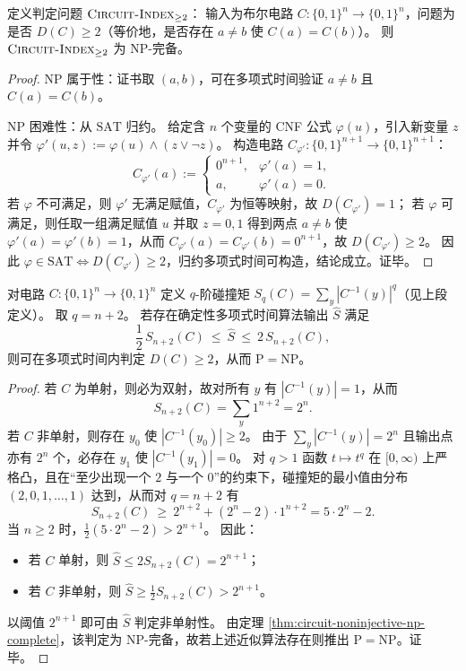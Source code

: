 \begin{theorem}\label{thm:circuit-noninjective-np-complete}
定义判定问题 \(\textsc{Circuit-Index}_{\ge 2}\)：
输入为布尔电路 \(C:\{0,1\}^n\to\{0,1\}^n\)，问题为是否 \(D(C)\ge 2\)（等价地，是否存在 \(a\neq b\) 使 \(C(a)=C(b)\)）。
则 \(\textsc{Circuit-Index}_{\ge 2}\) 为 \(\mathrm{NP}\)-完备。
\end{theorem}

\begin{proof}
\(\mathrm{NP}\) 属于性：证书取 \((a,b)\)，可在多项式时间验证 \(a\neq b\) 且 \(C(a)=C(b)\)。
\par
\(\mathrm{NP}\) 困难性：从 \(\mathrm{SAT}\) 归约。
给定含 \(n\) 个变量的 CNF 公式 \(\varphi(u)\)，引入新变量 \(z\) 并令 \(\varphi'(u,z):=\varphi(u)\wedge (z\vee\neg z)\)。
构造电路 \(C_{\varphi'}:\{0,1\}^{n+1}\to\{0,1\}^{n+1}\)：
\[
C_{\varphi'}(a):=
\begin{cases}
0^{n+1}, & \varphi'(a)=1,\\
a, & \varphi'(a)=0.
\end{cases}
\]
若 \(\varphi\) 不可满足，则 \(\varphi'\) 无满足赋值，\(C_{\varphi'}\) 为恒等映射，故 \(D(C_{\varphi'})=1\)；
若 \(\varphi\) 可满足，则任取一组满足赋值 \(u\) 并取 \(z=0,1\) 得到两点 \(a\neq b\) 使 \(\varphi'(a)=\varphi'(b)=1\)，从而 \(C_{\varphi'}(a)=C_{\varphi'}(b)=0^{n+1}\)，故 \(D(C_{\varphi'})\ge 2\)。
因此 \(\varphi\in\mathrm{SAT}\iff D(C_{\varphi'})\ge 2\)，归约多项式时间可构造，结论成立。证毕。
\end{proof}

\begin{theorem}\label{thm:circuit-collision-moment-two-approx-nplus2}
对电路 \(C:\{0,1\}^n\to\{0,1\}^n\) 定义 \(q\)-阶碰撞矩
\(
S_q(C)=\sum_y |C^{-1}(y)|^q
\)（见上段定义）。
取 \(q=n+2\)。
若存在确定性多项式时间算法输出 \(\widehat S\) 满足
\[
\frac12\,S_{n+2}(C)\ \le\ \widehat S\ \le\ 2\,S_{n+2}(C),
\]
则可在多项式时间内判定 \(D(C)\ge 2\)，从而 \(\mathrm{P}=\mathrm{NP}\)。
\end{theorem}
\begin{proof}
若 \(C\) 为单射，则必为双射，故对所有 \(y\) 有 \(|C^{-1}(y)|=1\)，从而
\[
S_{n+2}(C)=\sum_{y}1^{n+2}=2^n.
\]
若 \(C\) 非单射，则存在 \(y_0\) 使 \(|C^{-1}(y_0)|\ge 2\)。
由于 \(\sum_y |C^{-1}(y)|=2^n\) 且输出点亦有 \(2^n\) 个，必存在 \(y_1\) 使 \(|C^{-1}(y_1)|=0\)。
对 \(q>1\) 函数 \(t\mapsto t^q\) 在 \([0,\infty)\) 上严格凸，且在“至少出现一个 \(2\) 与一个 \(0\)”的约束下，碰撞矩的最小值由分布
\(
(2,0,1,\dots,1)
\)
达到，从而对 \(q=n+2\) 有
\[
S_{n+2}(C)\ \ge\ 2^{n+2}+(2^n-2)\cdot 1^{n+2}
=5\cdot 2^n-2.
\]
当 \(n\ge 2\) 时，\(\frac12(5\cdot 2^n-2)>2^{n+1}\)。
因此：
\begin{itemize}
\item 若 \(C\) 单射，则 \(\widehat S\le 2S_{n+2}(C)=2^{n+1}\)；
\item 若 \(C\) 非单射，则 \(\widehat S\ge \frac12 S_{n+2}(C)>2^{n+1}\)。
\end{itemize}
以阈值 \(2^{n+1}\) 即可由 \(\widehat S\) 判定非单射性。
由定理 \ref{thm:circuit-noninjective-np-complete}，该判定为 \(\mathrm{NP}\)-完备，故若上述近似算法存在则推出 \(\mathrm{P}=\mathrm{NP}\)。证毕。
\end{proof}

